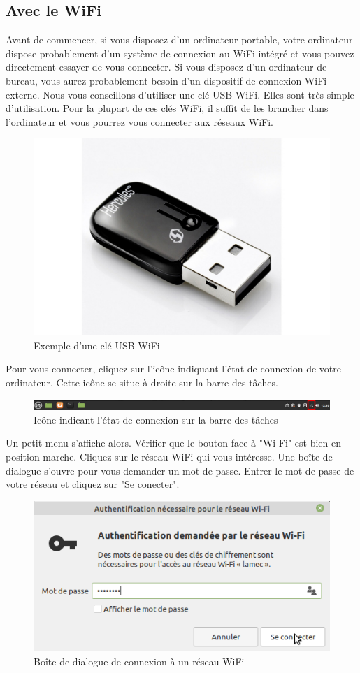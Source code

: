 \documentclass[12pt]{book}
\begin{document}
	\subsection{Avec le WiFi}
		Avant de commencer, si vous disposez d'un ordinateur portable, votre ordinateur dispose probablement d'un système de connexion au WiFi intégré et vous pouvez directement essayer de vous connecter.
		Si vous disposez d'un ordinateur de bureau, vous aurez probablement besoin d'un dispositif de connexion WiFi externe.
		Nous vous conseillons d'utiliser une clé USB WiFi.
		Elles sont très simple d'utilisation.
		Pour la plupart de ces clés WiFi, il suffit de les brancher dans l'ordinateur et vous pourrez vous connecter aux réseaux WiFi.
		\begin{figure}[h]
			\centering
			\includegraphics[width=.22\textwidth]{include/clewifi.jpg}
			\caption{Exemple d'une clé USB WiFi}
			\label{fig:clewifi}
		\end{figure}\par
		Pour vous connecter, cliquez sur l'icône indiquant l'état de connexion de votre ordinateur. Cette icône se situe à droite sur la barre des tâches.
		\begin{figure}[h]
			\centering
			\includegraphics[width=\textwidth]{include/connexion_barre.png}
			\caption{Icône indicant l'état de connexion sur la barre des tâches}
			\label{fig:barre_connexion}
		\end{figure}\par
		Un petit menu s'affiche alors.
		Vérifier que le bouton face à "Wi-Fi" est bien en position marche.
		Cliquez sur le réseau WiFi qui vous intéresse.
		Une boîte de dialogue s'ouvre pour vous demander un mot de passe.
		Entrer le mot de passe de votre réseau et cliquez sur "Se conecter".
		\begin{figure}[h]
			\centering
			\includegraphics[width=.51\textwidth]{include/wifi_mdp.png}
			\caption{Boîte de dialogue de connexion à un réseau WiFi}
			\label{fig:connexion_wifi}
		\end{figure}
\end{document}
